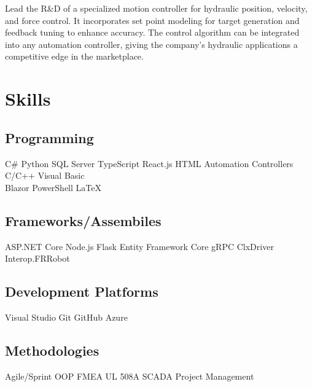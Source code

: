 \documentclass{TTurner}
\begin{document}
\begin{minipage}[t]{0.75\textwidth}
\begin{tightemize}
\item Lead the R\&D of a specialized motion controller for hydraulic position, velocity, and force control. It incorporates set point modeling for target generation and feedback tuning to enhance accuracy. The control algorithm can be integrated into any automation controller, giving the company's hydraulic applications a competitive edge in the marketplace. 
\end{tightemize}
\sectionsep


\end{minipage} 
\hfill
\begin{minipage}[t]{0.23\textwidth} 

\section{Skills}
\subsection{Programming}
\sectionsep
{}
C\# \textbullet{} Python \textbullet{} SQL Server \textbullet{} TypeScript \textbullet{} React.js \textbullet{} HTML \textbullet{} Automation Controllers\\
\sectionsep
{}
C/C++ \textbullet{} Visual Basic\\
Blazor \textbullet{} PowerShell \textbullet{} \LaTeX\\
\sectionsep
\sectionsep
\subsection{Frameworks/Assembiles}
\sectionsep
ASP.NET Core \textbullet{} Node.js \textbullet{} Flask \textbullet{} Entity Framework Core \textbullet{} gRPC \textbullet{} ClxDriver \textbullet{} Interop.FRRobot
\sectionsep
\sectionsep
\subsection{Development Platforms}
\sectionsep
Visual Studio \textbullet{} Git \textbullet{} GitHub \textbullet{} Azure\\
\sectionsep
\subsection{Methodologies}
\sectionsep
Agile/Sprint \textbullet{} OOP \textbullet{} FMEA \textbullet{} UL 508A \textbullet{} SCADA \textbullet{} Project Management\\
\sectionsep



\end{minipage}
\end{document}
